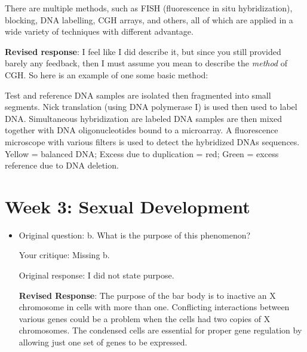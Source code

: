 \documentclass[basic,plain]{inVerba-notes}
\begin{document}
\begin{itemize}
{    There are multiple methods, such as FISH (fluorescence in situ hybridization), blocking, DNA labelling, CGH arrays, and others, all of which are applied in a wide variety of techniques with different advantage.}

    \textbf{Revised response}: I feel like I did describe it, but since you still provided barely any feedback, then I must assume you mean to describe the \textit{method} of CGH\@. So here is an example of one some basic method: 

    Test and reference DNA samples are isolated then fragmented into small segments. Nick translation (using DNA polymerase I) is used then used to label DNA\@. Simultaneous hybridization are labeled DNA samples are then mixed together with DNA oligonucleotides bound to a microarray. A fluorescence microscope with various filters is used to detect the hybridized DNAs sequences. Yellow = balanced DNA; Excess due to duplication = red; Green = excess reference due to DNA deletion.
\end{itemize}

\section{Week 3: Sexual Development}
\begin{itemize}
    \item Original question: b. What is the purpose of this phenomenon?
    
    Your critique: Missing b.

    Original response: I did not state purpose.

    \textbf{Revised Response}: The purpose of the bar body is to inactive an X chromosome in cells with more than one. Conflicting interactions between various genes could be a problem when the cells had two copies of X chromosomes. The condensed cells are essential for proper gene regulation by allowing just one set of genes to be expressed.
\end{itemize}




\end{document}
